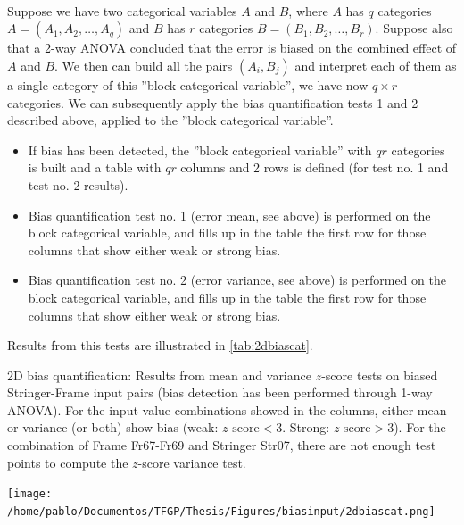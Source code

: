 \paragraph{ \\}
Suppose we have two categorical variables $A$ and $B$, where $A$ has $q$ categories $A=(A_1,A_2,\dots,A_q)$ and $B$ has $r$ categories $B=(B_1,B_2,\dots,B_r)$. Suppose also that a 2-way ANOVA concluded that the error is biased on the combined effect of $A$ and $B$. We then can build all the pairs $(A_i,B_j)$ and interpret each of them as a single category of this ''block categorical variable'', \ie we have now $q \times r$ categories. We can subsequently apply the bias quantification tests 1 and 2 described above, applied to the ''block categorical variable''.\\
\begin{itemize}
	\item If bias has been detected, the ''block categorical variable'' with $qr$ categories is built and a table with $qr$ columns and 2 rows is defined (for test no. 1 and test no. 2 results).
	\item Bias quantification test no. 1 (error mean, see above) is performed on the block categorical variable, and fills up in the table the first row for those columns that show either weak or strong bias.
	\item Bias quantification test no. 2 (error variance, see above) is performed on the block categorical variable, and fills up in the table the first row for those columns that show either weak or strong bias.
\end{itemize}
%
\indent Results from this tests are illustrated in \autoref{tab:2dbiascat}.
\begin{table}[!htb]
	\centering
	\caption{2D bias quantification: Results from mean and variance $z$-score tests on biased Stringer-Frame input pairs (bias detection has been performed through 1-way ANOVA). For the input value combinations showed in the columns, either mean or variance (or both) show bias (weak: $z\text{-score}<3$. Strong: $z\text{-score}>3$). For the combination of Frame Fr67-Fr69 and Stringer Str07, there are not enough test points to compute the $z$-score variance test.}
	\texttt{[image: /home/pablo/Documentos/TFGP/Thesis/Figures/biasinput/2dbiascat.png]}
	\label{tab:2dbiascat}
\end{table}
